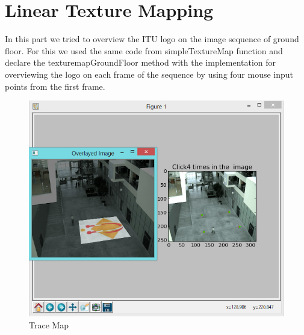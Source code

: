 \section{Linear Texture Mapping}

In this part we tried to overview the ITU logo on the image sequence of ground floor. For this we used the same code from simpleTextureMap function and declare the texturemapGroundFloor method with the implementation for overviewing the logo on each frame of the sequence by using four mouse input points from the first frame.

\begin{figure}[h!]
	\centering
	\includegraphics[width=\textwidth]{Handin2/images/linearmapping.jpg}
	\caption{Trace Map}
	\label{fig:trace}
\end{figure}
